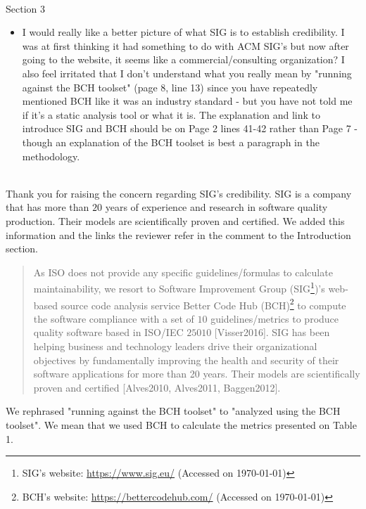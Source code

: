 \documentclass[11pt,fleqn]{article}
\newcommand{\eline}{\vspace*{.75\baselineskip}}
\newcommand{\Referee}[1]{\eline \noindent {\bf Reviewer comment #1:} \\}
\newcommand{\Us}{\eline \noindent {\bf Response:}\\}
\newenvironment{revcomment}[1][]
{\Referee{#1}\begin{rcomment}}
{\end{rcomment}}
\begin{document}
\begin{revcomment}[2.7]
    Section 3\\
    \begin{itemize}
        \item I would really like a better picture of what SIG is to establish credibility.  I was at first 
        thinking it had something to do with ACM SIG's but now after going to the website, it seems like a 
        commercial/consulting organization? I also feel irritated that I don't understand what you really mean 
        by "running against the BCH toolset" (page 8, line 13) since you have repeatedly mentioned BCH like it was 
        an industry standard - but you have not told me if it's a static analysis tool or what it is.  The explanation 
        and link to introduce SIG and BCH should be on Page 2 lines 41-42 rather than Page 7 - though an explanation 
        of the BCH toolset is best a paragraph in the methodology.  
    \end{itemize}
\end{revcomment}

\Us Thank you for raising the concern regarding SIG's credibility. SIG is a company that 
has more than $20$ years of experience and research in software quality production. 
Their models are scientifically proven and certified. We added this information and 
the links the reviewer refer in the comment to the Introduction section.

\begin{quote}
    As ISO does not provide any specific guidelines/formulas to 
calculate maintainability, we resort to Software Improvement Group 
(SIG\footnote{SIG's website: 
\url{https://www.sig.eu/} (Accessed on \today{})})'s web-based source 
code analysis service Better Code Hub (BCH)\footnote{BCH's 
website: \url{https://bettercodehub.com/} (Accessed on \today{})}  
to compute the software compliance with a set of $10$ 
guidelines/metrics to produce quality software based in ISO/IEC 
$25010$ [Visser2016]. SIG 
has been helping business and technology leaders drive their organizational 
objectives by fundamentally improving the health and security of 
their software applications for more than 20 years. Their 
models are scientifically proven and certified [Alves2010, Alves2011, Baggen2012].
\end{quote}

We rephrased "running against the BCH toolset" to "analyzed using the BCH toolset". We mean
that we used BCH to calculate the metrics presented on Table 1. 
\end{document}

